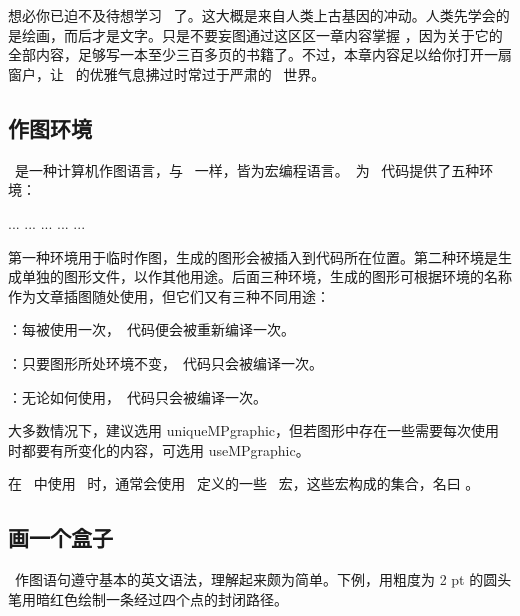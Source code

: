 \chapter[metapost]{\METAPOST}

想必你已迫不及待想学习 \METAPOST\ 了。这大概是来自人类上古基因的冲动。人类先学会的是绘画，而后才是文字。只是不要妄图通过这区区一章内容掌握 \METAPOST，因为关于它的全部内容，足够写一本至少三百多页的书籍了。不过，本章内容足以给你打开一扇窗户，让 \METAPOST\ 的优雅气息拂过时常过于严肃的 \CONTEXT\ 世界。

\section{作图环境}

\METAPOST\ 是一种计算机作图语言，与 \TEX\ 一样，皆为宏编程语言。\CONTEXT\ 为 \METAPOST\ 代码提供了五种环境：

\startTEX
\startMPcode ... \stopMPcode
\startMPpage ... \stopMPpage
{} ... \stopuseMPgraphic
{} ... \stopuniqueMPgraphic
{} ... \stopreusableMPgraphic
\stopTEX

\noindent 第一种环境用于临时作图，生成的图形会被插入到代码所在位置。第二种环境是生成单独的图形文件，以作其他用途。后面三种环境，生成的图形可根据环境的名称作为文章插图随处使用，但它们又有三种不同用途：

\startitemize[packed]
\item {}：每被使用一次，\METAPOST\ 代码便会被重新编译一次。
\item {}：只要图形所处环境不变，\METAPOST\ 代码只会被编译一次。
\item {}：无论如何使用，\METAPOST\ 代码只会被编译一次。
\stopitemize

\noindent 大多数情况下，建议选用 uniqueMPgraphic，但若图形中存在一些需要每次使用时都要有所变化的内容，可选用 useMPgraphic。

在 \CONTEXT\ 中使用 \METAPOST\ 时，通常会使用 \CONTEXT\ 定义的一些 \METAPOST\ 宏，这些宏构成的集合，名曰 \MetaFun。

\section{画一个盒子}

\METAPOST\ 作图语句遵守基本的英文语法，理解起来颇为简单。下例，用粗度为 2 pt 的圆头笔用暗红色绘制一条经过四个点的封闭路径。

